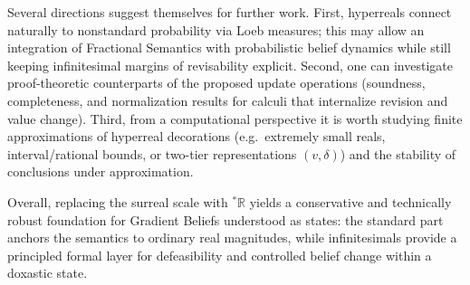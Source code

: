 \documentclass[12pt,a4paper,reqno]{amsart}
\theoremstyle{definition}
\begin{document}
\medskip
\noindent
Several directions suggest themselves for further work.
First, hyperreals connect naturally to nonstandard probability via Loeb measures; this may allow an
integration of Fractional Semantics with probabilistic belief dynamics while still keeping infinitesimal
margins of revisability explicit.
Second, one can investigate proof-theoretic counterparts of the proposed update operations (soundness,
completeness, and normalization results for calculi that internalize revision and value change).
Third, from a computational perspective it is worth studying finite approximations of hyperreal
decorations (e.g.\ extremely small reals, interval/rational bounds, or two-tier representations
$(v,\delta)$) and the stability of conclusions under approximation.

\medskip
\noindent
Overall, replacing the surreal scale with ${}^{\ast}\mathbb{R}$ yields a conservative and technically robust
foundation for Gradient Beliefs understood as states: the standard part anchors the semantics to ordinary
real magnitudes, while infinitesimals provide a principled formal layer for defeasibility and controlled
belief change within a doxastic state.
\end{document}
